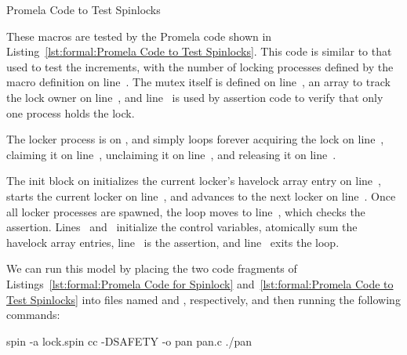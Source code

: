 \begin{listing}[tb]

\caption{Promela Code to Test Spinlocks}
\label{lst:formal:Promela Code to Test Spinlocks}
\end{listing}

\begin{fcvref}
These macros are tested by the Promela code shown in
Listing~\ref{lst:formal:Promela Code to Test Spinlocks}.
This code is similar to that used to test the increments,
with the number of locking processes defined by the 
macro definition on line~.
The mutex itself is defined on line~,
an array to track the lock owner
on line~, and line~ is used by assertion
code to verify that only one process holds the lock.
\end{fcvref}

\begin{fcvref}
The locker process is on , and simply loops forever
acquiring the lock on line~, claiming it on line~,
unclaiming it on line~, and releasing it on line~.
\end{fcvref}

\begin{fcvref}
The init block on  initializes the current locker's
havelock array entry on line~, starts the current locker on
line~, and advances to the next locker on line~.
Once all locker processes are spawned, the  loop
moves to line~, which checks the assertion.
Lines~ and~ initialize the control variables,
 atomically sum the havelock array entries,
line~ is the assertion, and line~ exits the loop.
\end{fcvref}

We can run this model by placing the two code fragments of
Listings~\ref{lst:formal:Promela Code for Spinlock}
and~\ref{lst:formal:Promela Code to Test Spinlocks} into
files named  and , respectively, and then running
the following commands:

\begin{VerbatimU}
spin -a lock.spin
cc -DSAFETY -o pan pan.c
./pan
\end{VerbatimU}

